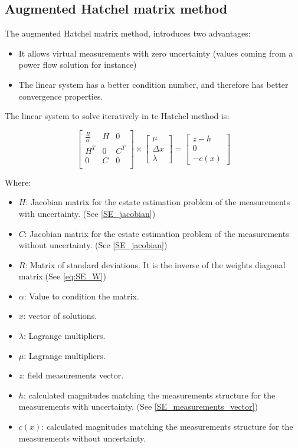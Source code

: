 \documentclass[nols,a4paper,twoside,notoc,fleqn]{tufte-book}
\begin{document}
\subsection{Augmented Hatchel matrix method}

The augmented Hatchel matrix method, introduces two advantages: 
\begin{itemize}
	\item It allows virtual measurements with zero uncertainty (values coming from a power flow solution for instance)
	\item The linear system has a better condition number, and therefore has better convergence properties.
\end{itemize}

The linear system to solve iteratively in te Hatchel method is:

\begin{equation}
\begin{bmatrix}
\frac{R}{\alpha} & H & 0 \\
H^T & 0 & C^T \\
0 & C & 0 \\
\end{bmatrix}
\times
\begin{bmatrix}
\mu\\
\Delta x\\
\lambda
\end{bmatrix}
=
\begin{bmatrix}
z-h\\
0\\
-c(x)
\end{bmatrix}
\end{equation}

Where:

\begin{itemize}
	\item $H$: Jacobian matrix for the estate estimation problem of the measurements with uncertainty. (See \ref{SE_jacobian})
	\item $C$: Jacobian matrix for the estate estimation problem of the measurements without uncertainty. (See \ref{SE_jacobian})
	\item $R$: Matrix of standard deviations. It is the inverse of the weights diagonal matrix.(See \ref{eq:SE_W})
	\item $\alpha$: Value to condition the matrix. 
	\item $x$: vector of solutions.
	\item $\lambda$: Lagrange multipliers.
	\item $\mu$: Lagrange multipliers.
	\item $z$: field measurements vector.
	\item $h$: calculated magnitudes matching the measurements structure for the measurements with uncertainty. (See \ref{SE_measurements_vector})
	\item $c(x)$: calculated magnitudes matching the measurements structure for the measurements without uncertainty.
\end{itemize}
\end{document}

